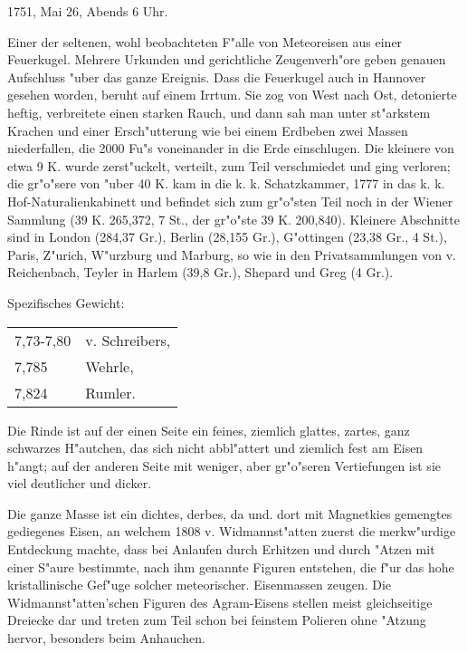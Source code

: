 \documentclass[a4paper, 11pt, oneside]{article}
\begin{document}
1751, Mai 26, Abends 6 Uhr.

Einer der seltenen, wohl beobachteten F"alle von Meteoreisen aus einer Feuerkugel. Mehrere Urkunden und gerichtliche Zeugenverh"ore geben genauen Aufschluss "uber das ganze Ereignis. Dass die Feuerkugel auch in Hannover gesehen worden, beruht auf einem Irrtum. Sie zog von West nach Ost, detonierte heftig, verbreitete einen starken Rauch, und dann sah man unter st"arkstem Krachen und einer Ersch"utterung wie bei einem Erdbeben zwei Massen niederfallen, die 2000 Fu"s voneinander in die Erde einschlugen. Die kleinere von etwa 9 K. wurde zerst"uckelt, verteilt, zum Teil verschmiedet und ging verloren; die gr"o"sere von "uber 40 K. kam in die k. k. Schatzkammer, 1777 in das k. k. Hof-Naturalienkabinett und befindet sich zum gr"o"sten Teil noch in der Wiener Sammlung (39 K. 265,372, 7 St., der gr"o"ste 39 K. 200,840). Kleinere Abschnitte sind in London (284,37 Gr.), Berlin (28,155 Gr.), G"ottingen (23,38 Gr., 4 St.), Paris, Z"urich, W"urzburg und Marburg, so wie in den Privatsammlungen von v. Reichenbach, Teyler in Harlem (39,8 Gr.), Shepard und Greg (4 Gr.).

Spezifisches Gewicht:  
\begin{table}[!ht]
    \centering\swabfamily\Large
    \begin{tabular}{l l}
        7,73-7,80 & v. Schreibers,\\
        7,785 & Wehrle,\\
        7,824 & Rumler.
    \end{tabular}
\end{table}

Die Rinde ist auf der einen Seite ein feines, ziemlich glattes, zartes, ganz schwarzes H"autchen, das sich nicht abbl"attert und ziemlich fest am Eisen h"angt; auf der anderen Seite mit weniger, aber gr"o"seren Vertiefungen ist sie viel deutlicher und dicker.

Die ganze Masse ist ein dichtes, derbes, da und. dort mit Magnetkies gemengtes gediegenes Eisen, an welchem 1808 v. Widmannst"atten zuerst die merkw"urdige Entdeckung machte, dass bei Anlaufen durch Erhitzen und durch "Atzen mit einer S"aure bestimmte, nach ihm genannte Figuren entstehen, die f"ur das hohe kristallinische Gef"uge solcher meteorischer. Eisenmassen zeugen. Die Widmannst"atten'schen Figuren des Agram-Eisens stellen meist gleichseitige Dreiecke dar und treten zum Teil schon bei feinstem Polieren ohne "Atzung hervor, besonders beim Anhauchen.
\end{document}
